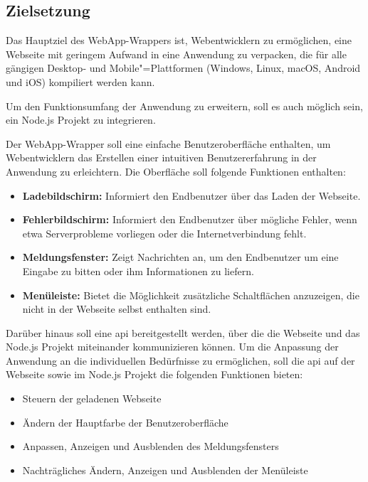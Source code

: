 \subsection{Zielsetzung}

Das Hauptziel des WebApp-Wrappers ist, Webentwicklern zu ermöglichen, eine Webseite mit geringem Aufwand in eine Anwendung zu verpacken, die für alle gängigen Desktop- und Mobile"=Plattformen (Windows, Linux, macOS, Android und iOS) kompiliert werden kann.

Um den Funktionsumfang der Anwendung zu erweitern, soll es auch möglich sein, ein Node.js Projekt zu integrieren.

Der WebApp-Wrapper soll eine einfache Benutzeroberfläche enthalten, um Webentwicklern das Erstellen einer intuitiven Benutzererfahrung in der Anwendung zu erleichtern.
Die Oberfläche soll folgende Funktionen enthalten:

\begin{itemize}
  \setlength\itemsep{-0.5em}
  \item \textbf{Ladebildschirm:}
  Informiert den Endbenutzer über das Laden der Webseite.
  \item \textbf{Fehlerbildschirm:}
  Informiert den Endbenutzer über mögliche Fehler, wenn etwa Serverprobleme vorliegen oder die Internetverbindung fehlt.
  \item \textbf{Meldungsfenster:}
  Zeigt Nachrichten an, um den Endbenutzer um eine Eingabe zu bitten oder ihm Informationen zu liefern.
  \item \textbf{Menüleiste:}
  Bietet die Möglichkeit zusätzliche Schaltflächen anzuzeigen, die nicht in der Webseite selbst enthalten sind.
\end{itemize}

Darüber hinaus soll eine \ac{api} bereitgestellt werden, über die die Webseite und das Node.js Projekt miteinander kommunizieren können.
Um die Anpassung der Anwendung an die individuellen Bedürfnisse zu ermöglichen, soll die \ac{api} auf der Webseite sowie im Node.js Projekt die folgenden Funktionen bieten:

\begin{itemize}
  \setlength\itemsep{-0.8em}
  \item Steuern der geladenen Webseite
  \item Ändern der Hauptfarbe der Benutzeroberfläche
  \item Anpassen, Anzeigen und Ausblenden des Meldungsfensters
  \item Nachträgliches Ändern, Anzeigen und Ausblenden der Menüleiste
\end{itemize}
